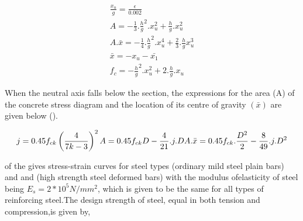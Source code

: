 \begin{align}
\frac{x_u}{g}=\frac{\epsilon}{0.002}\\
A=-\frac{1}{3}.\frac{h}{g}^2.x_u^2+\frac{h}{g}.x_u^2\\
A.\bar{x}=-\frac{1}{4}.\frac{h}{g}^2.x_u^4+\frac{2}{3}.\frac{h}{g}x_u^3\\
\bar{x}=-x_u-\bar{x_1}\\
f_c=-\frac{h}{g}^2.x_u^2+2.\frac{h}{g}.x_u
\end{align}

When the neutral axis falls below the section, the expressions for the
area (A) of the concrete stress diagram and the location of its centre
of gravity $(\bar x)$ are given below ().

\begin{equation}
j=0.45f_{ck}\left(\frac{4}{7k-3}\right)^2\\
A=0.45f_{ck}D-\frac{4}{21}.j.D\\
A.\bar{x}=0.45f_{ck}.\frac{D^2}{2}-\frac{8}{49}.j.D^2
\end{equation}

 of the  gives stress-strain curves for
steel types  (ordinary mild steel plain bars) and {\fefouronefive} and
{\fefivezerozero} (high strength steel deformed bars) with the modulus ofelasticity
of steel being $E_s = 2*10^5 N/mm^2$, which is given to be the same
for all types of reinforcing steel.The design strength of steel, equal
in both tension and compression,is given by,

